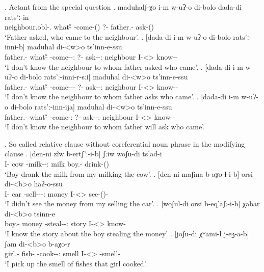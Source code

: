 \ex. Actant from the special question
	\ag. maduhalʃ-χo i-m w-uʔ-o di-bolo dada-di rats'ː-in\\
			{neighbour.obl-\Add.\Lat} {what-\H} {\M-come-\Pst(\Aor)} {?-\Indef} {father.\Obl-\Erg} {ask-\Pst(\Aor)}\\
			\glt `Father asked, who came to the neighbour'.
	\bg. [dada-di i-m w-uʔ-o di-bolo rats'ː-inni-b]  maduhal di-<w>o ts'inn-e-ssu\\
		{father.\Obl-\Erg}  {what-\H} {\M-come-\Pst-\Ptcp:\Pst} {?-\Indef} {ask-\Pst-\Ptcp:\Pst} neighbour {I-<\M>\Aff} {know-\Hab-\Neg}\\
		\glt `I don't know the neighbour to whom father asked who came'.
	\bg. [dada-di i-m w-uʔ-o di-bolo rats'ː-inni-r-sːi]  maduhal di-<w>o ts'inn-e-ssu\\
		{father.\Obl-\Erg}  {what-\H} {\M-come-\Pst-\Prog-\Attr} {?-\Indef} {ask-\Pst-\Ptcp:\Pst} neighbour {I-<\M>\Aff} {know-\Hab-\Neg}\\
		\glt `I don't know the neighbour to whom father asks who came'.		
	\bg. [dada-di i-m w-uʔ-o di-bolo rats'ː-inn-ija]  maduhal di-<w>o ts'inn-e-ssu\\
		{father.\Obl-\Erg}  {what-\H} {\M-come-\Ptcp:\Fut} {?-\Indef} {ask-\Npst-\Ptcp:\Fut} neighbour {I-<\M>\Aff} {know-\Hab-\Neg}\\
		\glt `I don't know the neighbour to whom father will ask who came'.

\ex. So called relative clause without coreferential noun phrase in the modifying clause
	\ag. [den-ni zĩw b-ertʃ'ː-i-b] ʃːiw woʃu-di ts'ad-i\\
			{I-\Erg} cow {\An-milk-\Pst-\Ptcp:\Pst} milk {boy.\Obl-\Erg} {drink-\Pst(\Aor)}\\
			\glt `Boy drank the milk from my milking the cow'.
	\bg. [den-ni maʃina b-aχo-ɬ-i-b] orsi di-<b>o haʔ-o-ssu\\
			 {I-\Erg}  car {\Nanf-sell-\Caus-\Pst-\Ptcp:\Pst} money {I-<\Nanf>\Aff} {see-\Pst(\Aor)-\Neg}\\
			 \glt `I didn't see the money from my selling the car'.
	\bg. [woʃul-di orsi b-eq'aʃː-i-b] χabar di-<b>o tsinn-e\\
			{boy.\Obl-\Erg} money {\Nanf-steal-\Pst-\Ptcp:\Pst} story {I-<\Nanf>\Aff} {know-\Hab}\\
			\glt `I know the story about the boy stealing the money'
	\bg. [joʃu-di χʷami-l j-eʒ-a-b] ʃam di-<b>o b-aχo-r\\
			{girl.\Obl-\Erg} {fish-\Pl} {\F-cook-\Pst-\Ptcp:\Pst} smell {I-<\Nanf>\Aff} {\Nanf-smell-\Prog}\\
			\glt `I pick up the smell of fishes that girl cooked'.
			 
